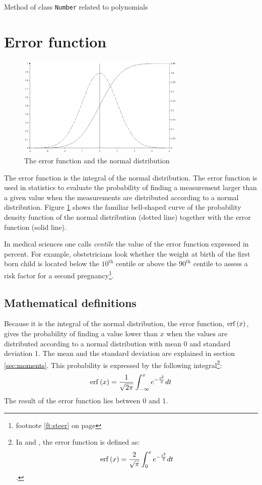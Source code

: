 \documentclass[twoside]{book}
\begin{document}
\begin{listing}
Method of class {\tt Number} related to polynomials
\label{ls:polynomialNumber}

\end{listing}

\section{Error function}
\label{sec:errorFunction}
\begin{figure}
\centering\includegraphics[width=8cm]{Figures/ErrorFunction}
\caption{The error function and the normal
distribution}\label{fig:errorFunction}
\end{figure}
The error function is the integral of the normal distribution. The
error function is used in statistics to evaluate the probability
of finding a measurement larger than a given value when the
measurements are distributed according to a normal distribution.
Figure \ref{sec:errorFunction} shows the familiar bell-shaped
curve of the probability density function of the normal
distribution (dotted line) together with the error function (solid
line).

In medical sciences one calls {\sl centile} the value of the error
function expressed in percent. For example, obstetricians look
whether the weight at birth of the first born child is located
below the $10^{\mbox{th}}$ centile or above the $90^{\mbox{th}}$
centile to assess a risk factor for a second
pregnancy\footnote{\cf footnote \ref{ft:steer} on page
\pageref{ft:steer}}.

\subsection{Mathematical definitions}
\label{sec:errorFunctionDef} Because it is the integral of the
normal distribution, the error function, $\mathop{\rm erf}\left(x\right)$,
gives the probability of finding a value lower than $x$ when the
values are distributed according to a normal distribution with
mean 0 and standard deviation 1. The mean and the standard
deviation are explained in section \ref{sec:moments}. This
probability is expressed by the following integral\footnote{In
\cite{AbrSteg} and \cite{Press}, the error function is defined as:
$$\mathop{\rm erf}\left(x\right)={2 \over \sqrt{\pi}}\int_0^x e^{-{t^2 \over 2
}}dt$$.}:
\begin{equation}
\mathop{\rm erf}\left(x\right)={1 \over \sqrt{2\pi}}\int_{-\infty}^x e^{-{t^2
\over 2 }}dt
\end{equation}
The result of the error function lies between 0 and 1.
\end{document}
